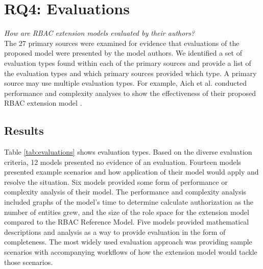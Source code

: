
\section{RQ4: Evaluations} \label{sec:evaluations}

\textit{How are RBAC extension models evaluated by their authors?}
\\

The 27 primary sources were examined for evidence that evaluations of the proposed model were presented by the model authors. We identified a set of evaluation types found within  each of the primary sources and provide a list of the evaluation types and which primary sources provided which type. A primary source may use multiple evaluation types. For example, Aich et al. conducted performance and complexity analyses to show the effectiveness of their proposed RBAC extension model \cite{aich09:role}.



\subsection{Results}

Table \ref{tab:evaluations} shows evaluation types.
Based on the diverse evaluation criteria, 12 models presented no evidence of an evaluation. Fourteen models presented example scenarios
and how application of their model would apply and resolve the situation. Six models provided some form of performance
or complexity analysis of their model.  The performance and complexity analysis included graphs of the model's time to determine calculate authorization 
as the number of entities grew, and the size of the role space for the extension model compared to the RBAC Reference Model. 
Five models provided mathematical descriptions and analysis as a way to provide evaluation in the form of completeness. 
The most widely used evaluation approach was providing sample scenarios with accompanying workflows of how the extension model
would tackle those scenarios. 

